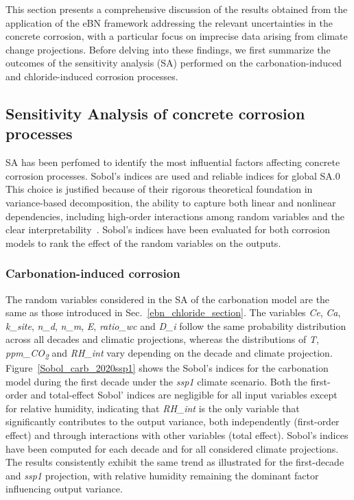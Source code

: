 
This section presents a comprehensive discussion of the results obtained from the application of the eBN framework addressing the relevant uncertainties in the concrete corrosion, with a particular focus on imprecise data arising from climate change projections. Before delving into these findings, we first summarize the outcomes of the sensitivity analysis (SA) performed on the carbonation-induced and chloride-induced corrosion processes.

\subsection{Sensitivity Analysis of concrete corrosion processes}
SA has been perfomed to identify the most influential factors affecting concrete corrosion processes.
Sobol's indices are used and reliable indices for global SA.0 
This choice is justified because of their rigorous theoretical foundation in variance-based decomposition, the ability to capture both linear and nonlinear dependencies, including high-order interactions among random variables and the clear interpretability~\cite{Sobols_indices_SOBOL}.
Sobol's indices have been evaluated for both corrosion models to rank the effect of the random variables on the outputs. 

\subsubsection{Carbonation-induced corrosion}\label{SA_carbonation}
The random variables considered in the SA of the carbonation model are the same as those introduced in Sec.~\ref{ebn_chloride_section}. 
The variables \textit{Ce}, \textit{Ca}, \textit{k\_site}, \textit{n\_d}, \textit{n\_m}, \textit{E}, \textit{ratio\_wc} and \textit{D\_i} follow the same probability distribution across all decades and climatic projections, whereas the distributions of \textit{T}, \textit{ppm\_CO\textsubscript{2}} and \textit{RH\_int} vary depending on the decade and climate projection. \\ 
Figure~\ref{Sobol_carb_2020ssp1} shows the Sobol's indices for the carbonation model during the first decade under the \textit{ssp1} climate scenario. 
Both the first-order and total-effect Sobol' indices are negligible for all input variables except for relative humidity, indicating that \textit{RH\_int} is the only variable that significantly contributes to the output variance, both independently (first-order effect) and through interactions with other variables (total effect).
Sobol's indices have been computed for each decade and for all considered climate projections. The results consistently exhibit the same trend as illustrated for the first-decade and \textit{ssp1} projection, with relative humidity remaining the dominant factor influencing output variance. 

